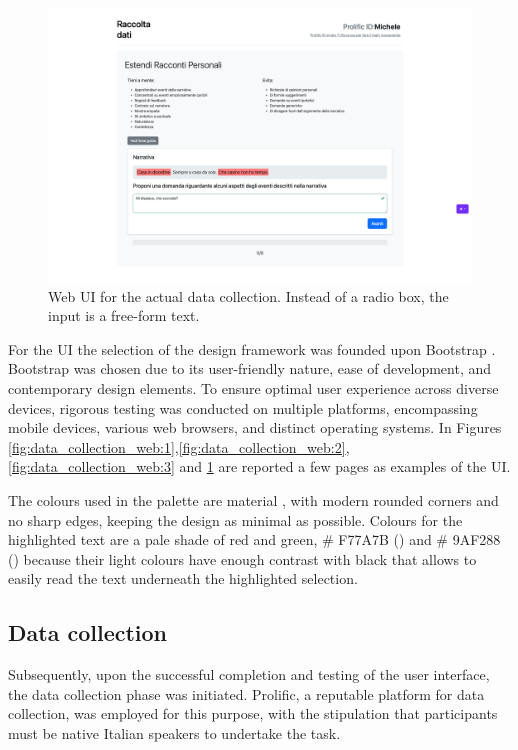 \begin{figure}[!htbp]
    \centering
    \includegraphics[width=1\linewidth]{assets//imgs/UI-datacollection.png}
    \caption{Web UI for the actual data collection. Instead of a radio box, the input is a free-form text.}
    \label{fig:data_collection_web:4}
\end{figure}

For the UI the selection of the design framework was founded upon Bootstrap \cite{bootstrap}. Bootstrap was chosen due to its user-friendly nature, ease of development, and contemporary design elements. To ensure optimal user experience across diverse devices, rigorous testing was conducted on multiple platforms, encompassing mobile devices, various web browsers, and distinct operating systems.
In Figures \ref{fig:data_collection_web:1},\ref{fig:data_collection_web:2},\ref{fig:data_collection_web:3} and \ref{fig:data_collection_web:4} are reported a few pages as examples of the UI.

The colours used in the palette are material \cite{material}, with modern rounded corners and no sharp edges, keeping the design as minimal as possible. Colours for the highlighted text are a pale shade of red and green, \# F77A7B (\redbg{\hspace{1em}}) and \# 9AF288 (\greenbg{\hspace{1em}}) because their light colours have enough contrast with black that allows to easily read the text underneath the highlighted selection.


\subsection{Data collection}
\label{cha:methodology-data-collection}
Subsequently, upon the successful completion and testing of the user interface, the data collection phase was initiated. Prolific, a reputable platform \cite{prolific} for data collection, was employed for this purpose, with the stipulation that participants must be native Italian speakers to undertake the task.

